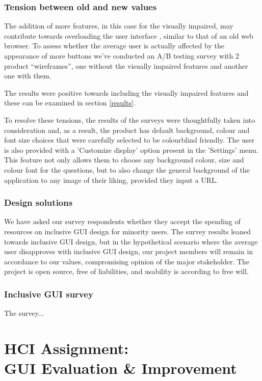 \documentclass{article}
\begin{document}
\subsubsection{Tension between old and new values}

The addition of more features, in this case for the visually impaired, may contribute towards overloading the user interface
, similar to that of an old web browser. To assess whether the average user is actually affected by the
appearance of more buttons we've conducted an A/B testing survey with 2 product ``wireframes'',
one without the visually impaired features and another one with them.

The results were positive towards including the visually impaired features and these can be examined in section \ref{results}.

To resolve these tensions, the results of the surveys were thoughtfully taken into consideration and, as a result, the product has default background, colour and font size choices that were carefully selected to be colourblind friendly. The user is also provided with a 'Customize display' option present in the 'Settings' menu. This feature not only allows them to choose any background colour, size and colour font for the questions, but to also change the general background of the application to any image of their liking, provided they input a URL. 
\subsubsection{Design solutions}
We have asked our survey respondents whether they accept the spending of resources on inclusive GUI design for minority users.
The survey results leaned towards inclusive GUI design, but in the hypothetical scenario where the average user
disapproves with inclusive GUI design, our project members will remain in accordance to our values,
compromising opinion of the major stakeholder. The project is open source, free of liabilities, and usability is according to free will. 

\subsubsection{Inclusive GUI survey}

The survey...


\section{HCI Assignment:\\GUI Evaluation \& Improvement\label{hci}}
\end{document}
